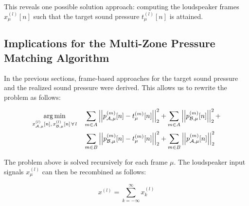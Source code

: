 This reveals one possible solution approach: computing the loudspeaker frames $x_\mu^{(l)}[n]$ such that the target sound pressure $t_\mu^{(l)}[n]$ is attained.

\subsection{Implications for the Multi-Zone Pressure Matching Algorithm}
In the previous sections, frame-based approaches for the target sound pressure and the realized sound pressure were derived.
This allows us to rewrite the problem as follows:

\begin{align}
    \argmin{x_{\za,\mu}^{(l)}[n],\,x_{\zb,\mu}^{(l)}[n]\,\forall\,l}{
       &\sum_{m\in A} \norm[2][2]{p_{\za,\mu}^{(m)}[n] - t_\mu^{(m)}[n]} +
        \sum_{m\in A} \norm[2][2]{p_{\zb,\mu}^{(m)}[n]} + \\
       &\sum_{m\in B} \norm[2][2]{p_{\zb,\mu}^{(m)}[n] - t_\mu^{(m)}[n]} + 
        \sum_{m\in B} \norm[2][2]{p_{\za,\mu}^{(m)}[n]}
    }
\end{align}

The problem above is solved recursively for each frame $\mu$. 
The loudspeaker input signals $x_\mu^{(l)}$ can then be recombined as follows:

\begin{equation}
    x^{(l)} = \sum_{k=-\infty}^{\infty} x_k^{(l)}
\end{equation}

